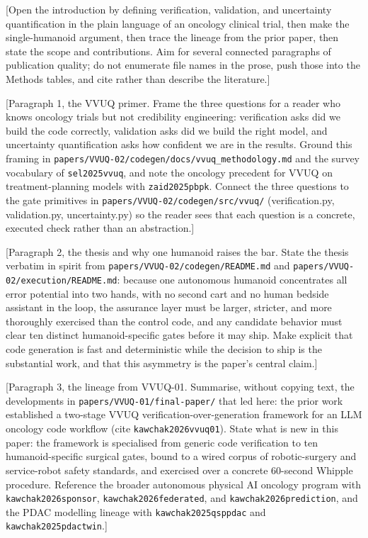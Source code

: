 
[Open the introduction by defining verification, validation, and uncertainty
quantification in the plain language of an oncology clinical trial, then make the
single-humanoid argument, then trace the lineage from the prior paper, then state
the scope and contributions. Aim for several connected paragraphs of publication
quality; do not enumerate file names in the prose, push those into the Methods
tables, and cite rather than describe the literature.]

[Paragraph 1, the VVUQ primer. Frame the three questions for a reader who knows
oncology trials but not credibility engineering: verification asks did we build
the code correctly, validation asks did we build the right model, and uncertainty
quantification asks how confident we are in the results. Ground this framing in
\texttt{papers/VVUQ-02/codegen/docs/vvuq\_methodology.md} and the survey vocabulary
of \texttt{sel2025vvuq}, and note the oncology precedent for VVUQ on
treatment-planning models with \texttt{zaid2025pbpk}. Connect the three questions
to the gate primitives in \texttt{papers/VVUQ-02/codegen/src/vvuq/} (verification.py,
validation.py, uncertainty.py) so the reader sees that each question is a concrete,
executed check rather than an abstraction.]

[Paragraph 2, the thesis and why one humanoid raises the bar. State the thesis
verbatim in spirit from \texttt{papers/VVUQ-02/codegen/README.md} and
\texttt{papers/VVUQ-02/execution/README.md}: because one autonomous humanoid
concentrates all error potential into two hands, with no second cart and no human
bedside assistant in the loop, the assurance layer must be larger, stricter, and
more thoroughly exercised than the control code, and any candidate behavior must
clear ten distinct humanoid-specific gates before it may ship. Make explicit that
code generation is fast and deterministic while the decision to ship is the
substantial work, and that this asymmetry is the paper's central claim.]

[Paragraph 3, the lineage from VVUQ-01. Summarise, without copying text, the
developments in \texttt{papers/VVUQ-01/final-paper/} that led here: the prior work
established a two-stage VVUQ verification-over-generation framework for an LLM
oncology code workflow (cite \texttt{kawchak2026vvuq01}). State what is new in this
paper: the framework is specialised from generic code verification to ten
humanoid-specific surgical gates, bound to a wired corpus of robotic-surgery and
service-robot safety standards, and exercised over a concrete 60-second Whipple
procedure. Reference the broader autonomous physical AI oncology program with
\texttt{kawchak2026sponsor}, \texttt{kawchak2026federated}, and
\texttt{kawchak2026prediction}, and the PDAC modelling lineage with
\texttt{kawchak2025qsppdac} and \texttt{kawchak2025pdactwin}.]

